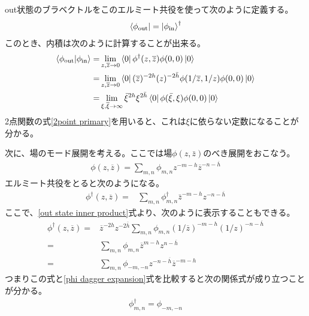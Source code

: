 \documentclass[11pt, dvipdfmx]{article}
\numberwithin{equation}{section}
\newcommand{\blankline}{\par\vspace{\baselineskip}} %
\begin{document}
out状態のブラベクトルをこのエルミート共役を使って次のように定義する。
\begin{align}
    \bra{\phi_{\text{out}}}=\ket{\phi_{\text{in}}}^\dagger
\end{align}
このとき、内積は次のように計算することが出来る。
\begin{align}
    \braket{\phi_{\text{out}}}{\phi_{\text{in}}}=&\lim_{z,\overline{z}\rightarrow 0}\bra{0}\phi^\dagger(z,\overline{z})\phi(0,0)\ket{0}\\
    =&\lim_{z,\overline{z}\rightarrow 0}\bra{0}(\overline{z})^{-2h}(z)^{-2\bar{h}} \phi(1/\overline{z},1/z)\phi(0,0)\ket{0}\\
    =&\lim_{\xi,\overline{\xi}\rightarrow \infty}\bar{\xi}^{2h}\xi^{2\bar{h}}\bra{0}\phi(\bar{\xi},\xi)\phi(0,0)\ket{0}\label{out state inner product}
\end{align}
2点関数の式\eqref{2point primary}を用いると、これは$\xi$に依らない定数になることが分かる。
\blankline
次に、場のモード展開を考える。ここでは場$\phi(z,\bar{z})$のべき展開をおこなう。
\begin{align}
    \phi(z,\overline{z})=\sum_{m,n}\phi_{m,n}z^{-m-h}\overline{z}^{-n-\overline{h}}\label{phi expansion}
\end{align}
エルミート共役をとると次のようになる。
\begin{align}
    \phi^\dagger(z,\overline{z})=&\sum_{m,n}\phi_{m,n}^\dagger \bar{z}^{-m-h}z^{-n-\overline{h}}\label{phi dagger expansion}
\end{align}
ここで、\eqref{out state inner product}式より、次のように表示することもできる。
\begin{align}
    \phi^\dagger(z,\overline{z})=&\overline{z}^{-2h}z^{-2\bar{h}}\sum_{m,n}\phi_{m,n}(1/\overline{z})^{-m-h}(1/z)^{-n-\overline{h}}\\
    =&\sum_{m,n}\phi_{m,n}\overline{z}^{m - h} z^{n - \overline{h}}\\
    =&\sum_{m,n}\phi_{-m,-n}z^{-n - \overline{h}}\overline{z}^{-m - h}
\end{align}
つまりこの式と\eqref{phi dagger expansion}式を比較すると次の関係式が成り立つことが分かる。
\begin{align}
    \phi_{m,n}^\dagger=\phi_{-m,-n}
\end{align}
\end{document}
